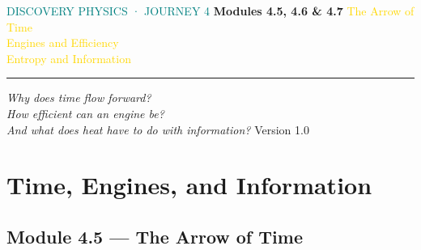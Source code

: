 \documentclass[12pt, a4paper, twoside]{book}
\begin{document}
\begin{titlepage}
\pagecolor{deep}\color{white}\centering\vspace*{2cm}


\vspace{0.3cm}
{\fontsize{11}{14}\selectfont\textcolor{teal}{\MakeUppercase{Discovery Physics · Journey 4}}}
\vspace{0.3cm}
{\fontsize{30}{36}\selectfont\bfseries Modules 4.5, 4.6 \& 4.7}
\vspace{0.3cm}
{\fontsize{18}{24}\selectfont\textcolor{gold}{%
The Arrow of Time\\[5pt]
Engines and Efficiency\\[5pt]
Entropy and Information}}
\vspace{0.5cm}
\textcolor{white!60}{\rule{8cm}{0.4pt}}
\vspace{0.4cm}
{\fontsize{12}{18}\selectfont\textcolor{white!80}{\itshape
Why does time flow forward?\\[4pt]
How efficient can an engine be?\\[4pt]
And what does heat have to do with information?}}
\vfill\textcolor{white!30}{\small Version 1.0}
\end{titlepage}
\nopagecolor
\tableofcontents

\chapter{Time, Engines, and Information}

\section{Module 4.5 — The Arrow of Time}
\label{sec:arrow_of_time}
\end{document}
